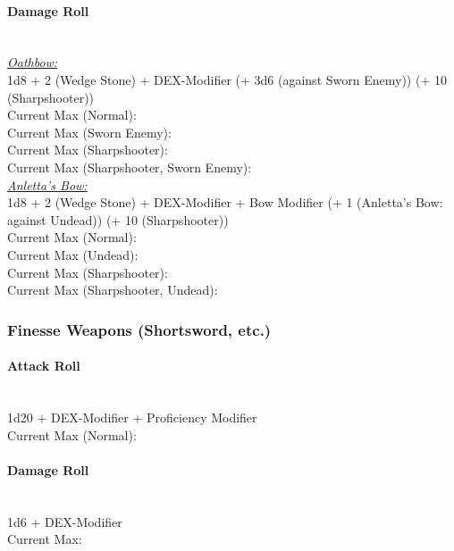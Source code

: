 \documentclass[letterpaper,openany,oneside,twocolumn]{book}
\begin{document}
\paragraph*{Damage Roll}\hfill\\
\underline{\textit{Oathbow:}}\\
1d8 + 2 (Wedge Stone) + DEX-Modifier (+ 3d6 (against Sworn Enemy)) (+ 10 (Sharpshooter)) \\
\indent Current Max (Normal):  \\
\indent Current Max (Sworn Enemy):  \\
\indent Current Max (Sharpshooter):  \\
\indent Current Max (Sharpshooter, Sworn Enemy): \\
\underline{\textit{Anletta's Bow:}}\\
1d8 + 2 (Wedge Stone) + DEX-Modifier + Bow Modifier (+ 1 (Anletta's Bow: against Undead)) (+ 10 (Sharpshooter)) \\
\indent Current Max (Normal):  \\
\indent Current Max (Undead):  \\
\indent Current Max (Sharpshooter):  \\
\indent Current Max (Sharpshooter, Undead): 
\subsubsection*{Finesse Weapons (Shortsword, etc.)}
\paragraph*{Attack Roll}\hfill\\
1d20 + DEX-Modifier + Proficiency Modifier \\
\indent Current Max (Normal): 
\paragraph*{Damage Roll}\hfill\\
1d6 + DEX-Modifier \\
\indent Current Max: 
\end{document}
